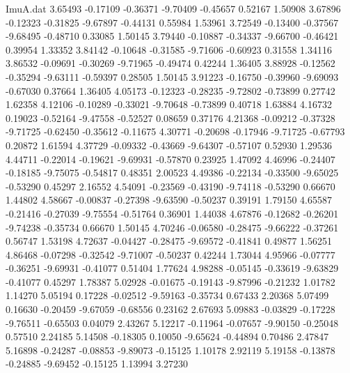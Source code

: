 \begin{filecontents}{ImuA.dat}
   3.65493   -0.17109   -0.36371   -9.70409   -0.45657    0.52167    1.50908
   3.67896   -0.12323   -0.31825   -9.67897   -0.44131    0.55984    1.53961
   3.72549   -0.13400   -0.37567   -9.68495   -0.48710    0.33085    1.50145
   3.79440   -0.10887   -0.34337   -9.66700   -0.46421    0.39954    1.33352
   3.84142   -0.10648   -0.31585   -9.71606   -0.60923    0.31558    1.34116
   3.86532   -0.09691   -0.30269   -9.71965   -0.49474    0.42244    1.36405
   3.88928   -0.12562   -0.35294   -9.63111   -0.59397    0.28505    1.50145
   3.91223   -0.16750   -0.39960   -9.69093   -0.67030    0.37664    1.36405
   4.05173   -0.12323   -0.28235   -9.72802   -0.73899    0.27742    1.62358
   4.12106   -0.10289   -0.33021   -9.70648   -0.73899    0.40718    1.63884
   4.16732    0.19023   -0.52164   -9.47558   -0.52527    0.08659    0.37176
   4.21368   -0.09212   -0.37328   -9.71725   -0.62450   -0.35612   -0.11675
   4.30771   -0.20698   -0.17946   -9.71725   -0.67793    0.20872    1.61594
   4.37729   -0.09332   -0.43669   -9.64307   -0.57107    0.52930    1.29536
   4.44711   -0.22014   -0.19621   -9.69931   -0.57870    0.23925    1.47092
   4.46996   -0.24407   -0.18185   -9.75075   -0.54817    0.48351    2.00523
   4.49386   -0.22134   -0.33500   -9.65025   -0.53290    0.45297    2.16552
   4.54091   -0.23569   -0.43190   -9.74118   -0.53290    0.66670    1.44802
   4.58667   -0.00837   -0.27398   -9.63590   -0.50237    0.39191    1.79150
   4.65587   -0.21416   -0.27039   -9.75554   -0.51764    0.36901    1.44038
   4.67876   -0.12682   -0.26201   -9.74238   -0.35734    0.66670    1.50145
   4.70246   -0.06580   -0.28475   -9.66222   -0.37261    0.56747    1.53198
   4.72637   -0.04427   -0.28475   -9.69572   -0.41841    0.49877    1.56251
   4.86468   -0.07298   -0.32542   -9.71007   -0.50237    0.42244    1.73044
   4.95966   -0.07777   -0.36251   -9.69931   -0.41077    0.51404    1.77624
   4.98288   -0.05145   -0.33619   -9.63829   -0.41077    0.45297    1.78387
   5.02928   -0.01675   -0.19143   -9.87996   -0.21232    1.01782    1.14270
   5.05194    0.17228   -0.02512   -9.59163   -0.35734    0.67433    2.20368
   5.07499    0.16630   -0.20459   -9.67059   -0.68556    0.23162    2.67693
   5.09883   -0.03829   -0.17228   -9.76511   -0.65503    0.04079    2.43267
   5.12217   -0.11964   -0.07657   -9.90150   -0.25048    0.57510    2.24185
   5.14508   -0.18305    0.10050   -9.65624   -0.44894    0.70486    2.47847
   5.16898   -0.24287   -0.08853   -9.89073   -0.15125    1.10178    2.92119
   5.19158   -0.13878   -0.24885   -9.69452   -0.15125    1.13994    3.27230

\end{filecontents}
